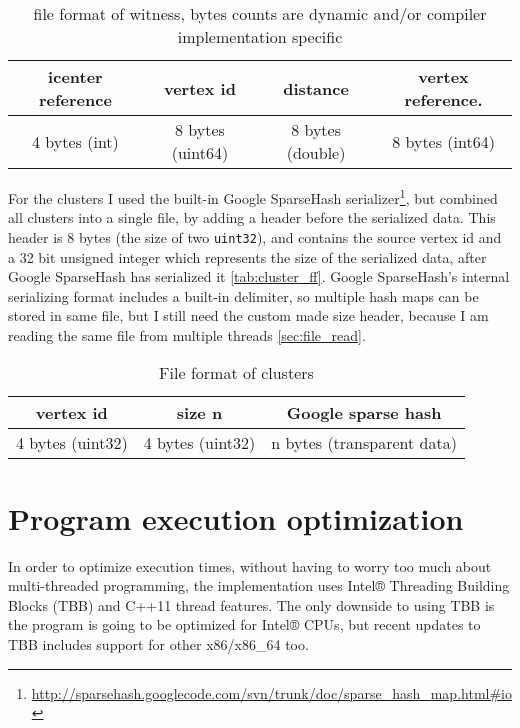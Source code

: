 \begin{table}[htbp]
    \centering
    \begin{tabular}{ | c | c | c | c |}
        \hline
        icenter reference & vertex id & distance & vertex reference.\\
        \hline
        4 bytes (int) & 8 bytes (uint64) & 8 bytes (double) & 8 bytes (int64)\\
        \hline
    \end{tabular}
    \caption{file format of witness, bytes counts are dynamic and/or compiler
             implementation specific}
    \label{tab:witness_ff}
\end{table}

For the clusters I used the built-in Google
SparseHash serializer\footnote{\url{
http://sparsehash.googlecode.com/svn/trunk/doc/sparse\_hash\_map.html\#io}}, 
but combined all clusters into a single file, by adding a header before the
serialized data. This header is 8 bytes (the size of two \texttt{uint32}), and
contains the source vertex id and a 32 bit unsigned integer which represents
the size of the serialized data, after Google SparseHash has serialized it
\autoref{tab:cluster_ff}. Google SparseHash's internal serializing format
includes a built-in delimiter, so multiple hash maps can be stored in same
file, but I still need the custom made size header, because I am reading the
same file from multiple threads \autoref{sec:file_read}.

\begin{table}[htbp]
    \centering
    \begin{tabular}{ | c | c | c |}
        \hline
        vertex id & size n & Google sparse hash \\
        \hline
        4 bytes (uint32) & 4 bytes (uint32) & n bytes (transparent data)\\
        \hline
    \end{tabular}
    \caption{File format of clusters}
    \label{tab:cluster_ff}
\end{table}

\section{Program execution optimization}

In order to optimize execution times, without having to worry too much about
multi-threaded programming, the implementation uses Intel® Threading Building
Blocks (TBB) and C++11 thread features. The only downside to using TBB is the
program is going to be optimized for Intel® CPUs, but recent updates to TBB
includes support for other x86/x86\_64 too.

